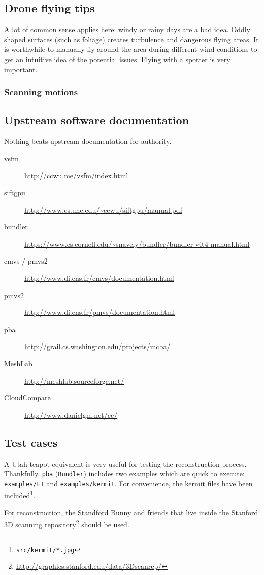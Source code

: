 \subsection{Drone flying tips}
A lot of common sense applies here: windy or rainy days are a bad idea. Oddly shaped surfaces (such as foliage) creates turbulence and dangerous flying areas. It is worthwhile to manually fly around the area during different wind conditions to get an intuitive idea of the potential issues. Flying with a spotter is very important.

\subsubsection{Scanning motions}

\subsection{Upstream software documentation}
Nothing beats upstream documentation for authority.
\begin{description}
    \item[vsfm] \url{http://ccwu.me/vsfm/index.html}
    \item[siftgpu] \url{http://www.cs.unc.edu/~ccwu/siftgpu/manual.pdf}
    \item[bundler] \url{https://www.cs.cornell.edu/~snavely/bundler/bundler-v0.4-manual.html}
    \item[cmvs / pmvs2] \url{http://www.di.ens.fr/cmvs/documentation.html}
    \item[pmvs2] \url{http://www.di.ens.fr/pmvs/documentation.html}
    \item[pba] \url{http://grail.cs.washington.edu/projects/mcba/}
    \item[MeshLab] \url{http://meshlab.sourceforge.net/}
    \item[CloudCompare] \url{http://www.danielgm.net/cc/}
\end{description}
\subsection{Test cases}
A Utah teapot equivalent is very useful for testing the reconstruction process. Thankfully, {\tt pba} ({\tt Bundler}) includes two examples which are quick to execute: {\tt examples/ET} and {\tt examples/kermit}. For convenience, the kermit files have been included\footnote{{\tt src/kermit/*.jpg}}.

For reconstruction, the Standford Bunny and friends that live inside the Stanford 3D scanning repository\footnote{\url{http://graphics.stanford.edu/data/3Dscanrep/}} should be used.
